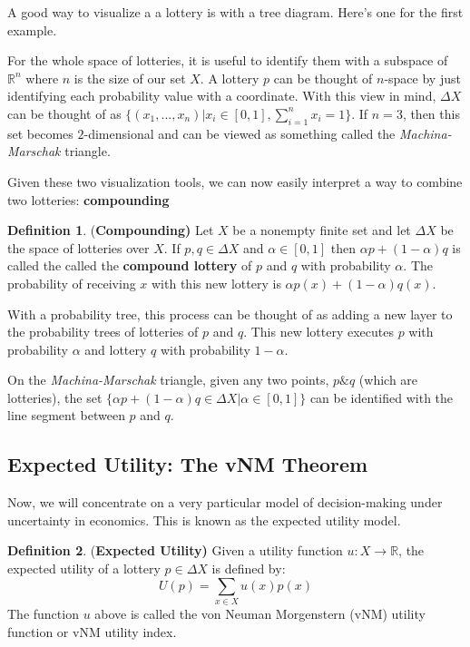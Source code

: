 \documentclass[12pt]{article}
\theoremstyle{plain}
\theoremstyle{definition}
\newtheorem{defin}{Definition}[subsection]
\theoremstyle{remark}
\newcommand{\tn}[1]{\textnormal{#1}}
\newcommand{\3}{\vspace*{3mm}}
\newcommand{\name}[1]{\tn{(\textbf{#1)}}}
\newcommand{\RR}{\mathbb{R}}
\begin{document}
A good way to visualize a a lottery is with a tree diagram. Here's one for the first example. 


For the whole space of lotteries, it is useful to identify them with a subspace of ${\RR}^n$ where $n$ is the size of our set $X$. A lottery $p$ can be thought of $n$-space by just identifying each probability value with a coordinate. With this view in mind, $\Delta{X}$ can be thought of as $\{(x_1, ... ,x_n) | x_i \in [0,1], \sum_{i =1}^n x_i = 1\}$. If $n = 3$, then this set becomes $2$-dimensional and can be viewed as something called the \emph{Machina-Marschak} triangle. 


Given these two visualization tools, we can now easily interpret a way to combine two lotteries: \textbf{compounding}

\begin{defin} \name{Compounding}
Let $X$ be a nonempty finite set and let $\Delta{X}$ be the space of lotteries over $X$. If $p,q \in \Delta{X}$ and $\alpha \in [0,1]$ then $\alpha p + (1-\alpha) q$ is called the called the \textbf{compound lottery} of $p$ and $q$ with probability $\alpha$. The probability of receiving $x$ with this new lottery is $\alpha p(x) + (1-\alpha) q(x)$.

\end{defin}

With a probability tree, this process can be thought of as adding a new layer to the probability trees of lotteries of $p$ and $q$. This new lottery executes $p$ with probability $\alpha$ and lottery $q$ with probability $1-\alpha$. 


On the \emph{Machina-Marschak} triangle, given any two points, $p \& q$ (which are lotteries), the set $\{\alpha p + (1-\alpha) q \in \Delta{X} | \alpha \in [0,1] \}$ can be identified with the line segment between $p$ and $q$. 


\subsection{Expected Utility: The vNM Theorem }

Now, we will concentrate on a very particular model of decision-making under uncertainty in economics. This is known as the expected utility model.


\begin{defin} \name{Expected Utility}
Given a utility function $u : X \to \RR$, the expected utility of a lottery $p \in \Delta{X}$ is defined by: 
\[U(p) = \sum_{x \in X} u(x) p(x) \]
The function $u$ above is called the von Neuman Morgenstern (vNM) utility function or vNM utility index. 
\end{defin}
\end{document}
